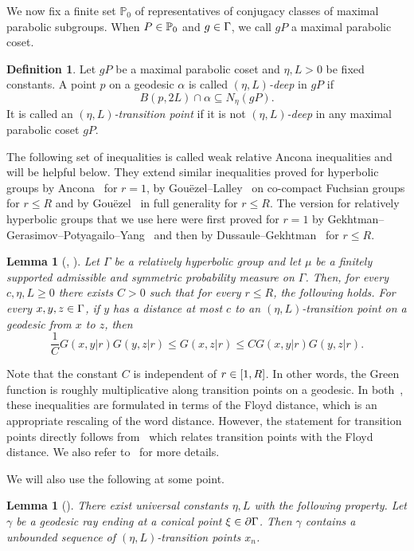 \documentclass[10pt,a4paper]{amsart}
\newcommand{\pG}{\partial{\Gamma}}
\newcommand{\bbP}{\mathbb{P}}
\let\oldin\in
\renewcommand{\in}{\mathchoice{\oldin}{\oldin}{\,\oldin\,}{\,\oldin\,}}
\newtheorem{lemm}[theo]{Lemma}
\theoremstyle{definition}\newtheorem{defi}[theo]{Definition}
\begin{document}
We now fix a finite set $\bbP_0$ of representatives of conjugacy classes of maximal parabolic subgroups. When $P\in \bbP_0$ and $g\in \Gamma$, we call $gP$ a maximal parabolic coset.
\begin{defi}
Let $gP$ be a maximal parabolic coset and $\eta, L>0$ be fixed constants. A point $p$ on a geodesic $\alpha$ is called \emph{$(\eta, L)$-deep} in $gP$ if
\[
B(p, 2L)\cap \alpha\subseteq N_\eta(gP).
\]
It is called an \emph{$(\eta, L)$-transition point} if it is not \emph{$(\eta, L)$-deep} in any maximal parabolic coset $gP$.
\end{defi}

The following set of inequalities is called weak relative Ancona inequalities and will be helpful below. They extend similar inequalities proved for hyperbolic groups by Ancona~\cite{Ancona} for $r=1$, by Gou\"ezel--Lalley~\cite{GouezelLalley} on co-compact Fuchsian groups for $r\leq R$ and by Gou\"ezel~\cite{Gouezel} in full generality for $r\leq R$. The version for relatively hyperbolic groups that we use here were first proved for $r=1$ by Gekhtman--Gerasimov--Potyagailo--Yang~\cite{GGPY} and then by Dussaule--Gekhtman~\cite{DG21} for $r\leq R$.

\begin{lemm}[{\cite[Theorem~1.1]{GGPY}, \cite[Theorem~1.6]{DG21}}]
\label{weakAncona}
Let $\Gamma$ be a relatively hyperbolic group and let $\mu$ be a finitely supported admissible and symmetric probability measure on $\Gamma$. Then, for every $c,\eta,L\geq 0$ there exists $C>0$ such that for every $r\leq R$, the following holds. For every $x,y,z\in \Gamma$, if $y$ has a distance at most $c$ to an $(\eta,L)$-transition point on a geodesic from $x$ to $z$, then
\[
\frac{1}{C}G(x,y|r)G(y,z|r)\leq G(x,z|r)\leq C G(x,y|r)G(y,z|r).
\]
\end{lemm}

Note that the constant $C$ is independent of $r\in [1,R]$. In other words, the Green function is roughly multiplicative along transition points on a geodesic. In both~\cite{DG21,GGPY}, these inequalities are formulated in terms of the Floyd distance, which is an appropriate rescaling of the word distance. However, the statement for transition points directly follows from~\cite[Corollary~5.10]{GePoGGD} which relates transition points with the Floyd distance. We also refer to~\cite[Section~9]{GGPY} for more details.

We will also use the following at some point.

\begin{lemm}[{\cite[Lemma~2.14]{YangPS}}]\label{ConCharLem}
There exist universal constants $\eta, L$ with the following property. Let $\gamma$ be a geodesic ray ending at a conical point $\xi\in\pG$. Then $\gamma$ contains a unbounded sequence of $(\eta,L)$-transition points $x_n$.
\end{lemm}
\end{document}
